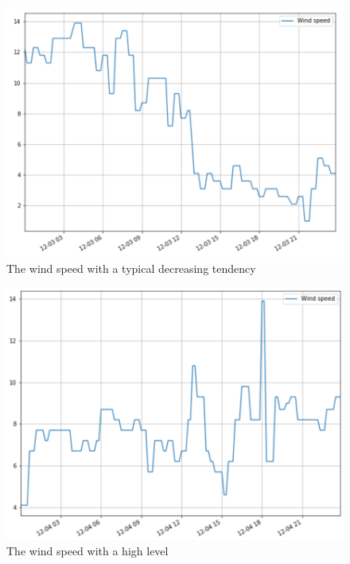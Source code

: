 \documentclass[12pt,a4paper]{report}
\begin{document}
    \begin{figure}[ht]
        \centerline{\includegraphics[scale=1]{1203}}
        \caption{The wind speed with a typical decreasing tendency}
        \label{fig_1203}
    \end{figure}

    \begin{figure}[ht]
        \centerline{\includegraphics[scale=1]{1204}}
        \caption{The wind speed with a high level}
        \label{fig_1204}
    \end{figure}
\end{document}
